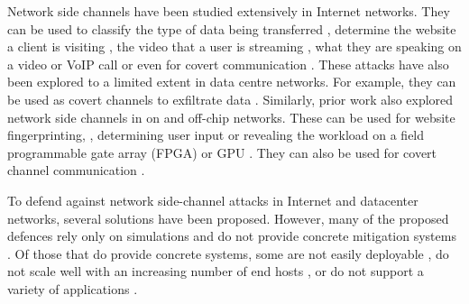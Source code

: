 Network side channels have been studied extensively in Internet networks.
They can be used to classify the type of data being transferred \cite{shapira2019flowpic}, determine the website a client is visiting \cite{bhat2019varcnn, dyer2012peek, hayes2016kfp, sirinam2018df}, the video that a user is streaming \cite{schuster2017beautyburst}, what they are speaking on a video or VoIP call \cite{white2011phonotactic} or even for covert communication \cite{barradas2020poking}.
These attacks have also been explored to a limited extent in data centre networks.
For example, they can be used as covert channels to exfiltrate data \cite{tahir2016sneak}.
Similarly, prior work also explored network side channels in on and off-chip networks. 
These can be used for website fingerprinting, \cite{tan2021invisible, side2022lockeddown}, determining user input \cite{tan2021invisible, rodrigues2024busted} or revealing the workload on a field programmable gate array (FPGA) or GPU \cite{tan2021invisible, giechaskiel2022cross, fang2023gotcha}.
They can also be used for covert channel communication \cite{khaliq2021timing, giechaskiel2022cross, side2022lockeddown, dutta2023spy}.

To defend against network side-channel attacks in Internet and datacenter networks, several solutions have been proposed. 
However, many of the proposed defences rely only on simulations and do not provide concrete mitigation systems \cite{abusnaina2020dfd, cai2014tamaraw, gong2022surakav, hou2020wf, juarez2016wtfpad, nasr2021blind, rahman2020mockingbird, shan2021dolos, wang2014supersequence, wright2009morphing}.
Of those that do provide concrete systems, some are not easily deployable \cite{cai2014csbuflo, mehta2022pacer, smith2022qcsd, wang2017walkie}, do not scale well with an increasing number of end hosts \cite{luo2011httpos, cai2014csbuflo, smith2022qcsd, wang2017walkie, cherubin2017llama, barradas2017deltashaper}, or do not support a variety of applications \cite{luo2011httpos, wang2017walkie, cherubin2017llama}.

